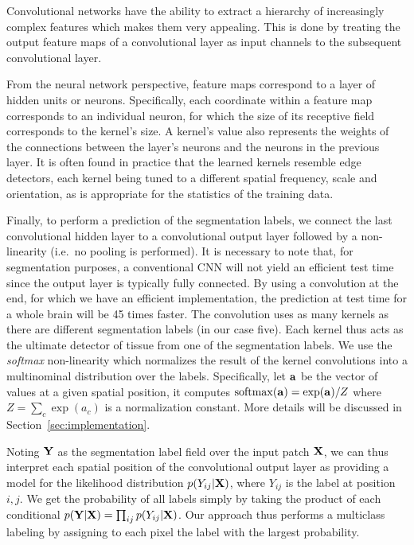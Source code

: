 \documentclass[final,5p,times,twocolumn]{elsarticle}
\begin{document}
Convolutional networks have the ability to extract a hierarchy of increasingly complex features which makes them very appealing. This is done by treating the output feature maps of a convolutional layer as input channels to the subsequent convolutional layer. 


From the neural network perspective, feature maps correspond to a layer of hidden units or neurons. Specifically, each coordinate within a feature map corresponds to an individual neuron, for which the size of its receptive field corresponds to the kernel's size. A kernel's value also represents the weights of the connections between the layer's neurons and the neurons in the previous layer. It is often found in practice that the learned kernels resemble edge detectors, each kernel being tuned to a different spatial frequency, scale and orientation, as is appropriate for the statistics of the training data. 




Finally, to perform a prediction of the segmentation labels, we connect the last convolutional hidden layer to a convolutional output layer followed by a non-linearity (i.e.\ no pooling is performed).  It is necessary to note that, for segmentation purposes, a conventional CNN will not yield an efficient test time since the output layer is typically fully connected. By using a convolution at the end, for which we have an efficient implementation, the prediction at test time for a whole brain will be 45 times faster.
The convolution uses as many kernels as there are different segmentation labels (in our case five). Each kernel thus acts as the ultimate detector of tissue from one of the segmentation labels. We use the {\it softmax} non-linearity which normalizes the result of the kernel convolutions into a multinominal distribution over the labels. Specifically, let ${\bf a}$ be the vector of values at a given spatial position, it computes ${\rm softmax}({\bf a}) = \exp({\bf a})/Z$ where $Z=\sum_c \exp(a_c)$ is a normalization constant.  More details will be discussed in Section~\ref{sec:implementation}.



Noting ${\bf Y}$ as the segmentation label field over the input patch ${\bf X}$, we can thus interpret each spatial position of the convolutional output layer as providing a model for the likelihood distribution $p(Y_{ij}|{\bf X})$, where $Y_{ij}$ is the label at position $i,j$. We get the probability of all labels simply by taking the product of each conditional $p({\bf Y}|{\bf X}) = \prod_{ij} p(Y_{ij}|{\bf X})$. Our approach thus performs a multiclass labeling by assigning to each pixel the label with the largest probability. 
\end{document}
